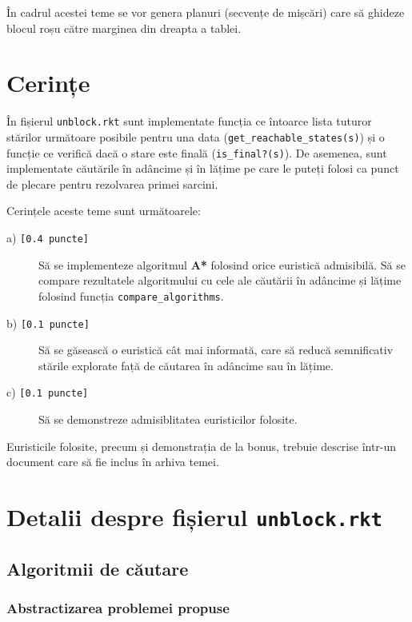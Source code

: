 \documentclass[12pt]{article}
\begin{document}
În cadrul acestei teme se vor genera planuri (secvențe de mișcări)
care să ghideze blocul roșu către marginea din dreapta a tablei.

\section{Cerințe}
\label{sec:tasks}

În fișierul \texttt{unblock.rkt} sunt implementate funcția ce întoarce
lista tuturor stărilor următoare posibile pentru una data
(\texttt{get\_reachable\_states(s)}) și o funcție ce verifică dacă o
stare este finală (\texttt{is\_final?(s)}). De asemenea, sunt
implementate căutările în adâncime și în lățime pe care le puteți
folosi ca punct de plecare pentru rezolvarea primei sarcini.

Cerințele aceste teme sunt următoarele:
\begin{description}
\item[a) \texttt{[0.4 puncte]}] Să se implementeze algoritmul
  \textbf{A*} folosind orice euristică admisibilă. Să se compare
  rezultatele algoritmului cu cele ale căutării în adâncime și lățime
  folosind funcția \texttt{compare\_algorithms}.
\item[b) \texttt{[0.1 puncte]}] Să se găsească o euristică cât mai
  informată, care să reducă semnificativ stările explorate față de
  căutarea în adâncime sau în lățime.
\item[c) \texttt{[0.1 puncte]}] Să se demonstreze admisiblitatea
  euristicilor folosite.
\end{description}

Euristicile folosite, precum și demonstrația de la bonus, trebuie
descrise într-un document care să fie inclus în arhiva temei.

\section{Detalii despre fișierul \texttt{unblock.rkt}}
\label{sec:implementare}

\subsection{Algoritmii de căutare}
\label{sec:algs}

\subsubsection*{Abstractizarea problemei propuse}
\label{sec:abs}
\end{document}
